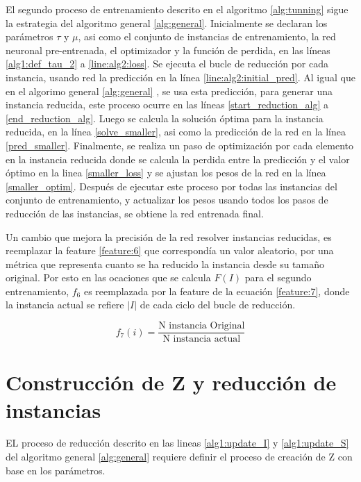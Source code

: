 \documentclass[spanish, a4paper, 12pt, openany,final]{book}
\begin{document}
El segundo proceso de entrenamiento descrito en el algoritmo \ref{alg:tunning} sigue la estrategia del algoritmo general \ref{alg:general}. Inicialmente se declaran los parámetros $\tau$ y $\mu$, asi como el conjunto de instancias de entrenamiento, la red neuronal pre-entrenada, el optimizador y la función de perdida, en las líneas \ref{alg1:def_tau_2} a \ref{line:alg2:loss}. Se ejecuta el bucle de reducción por cada instancia, usando red la predicción en la línea \ref{line:alg2:initial_pred}. Al igual que en el algorimo general \ref{alg:general} , se usa esta predicción, para generar una instancia reducida, este proceso ocurre en las líneas \ref{start_reduction_alg} a \ref{end_reduction_alg}. Luego se calcula la solución óptima para la instancia reducida, en la línea \ref{solve_smaller}, asi como la predicción de la red en la línea \ref{pred_smaller}. Finalmente, se realiza un paso de optimización por cada elemento en la instancia reducida donde se calcula la perdida entre la predicción y el valor óptimo en la linea \ref{smaller_loss} y se ajustan los pesos de la red en la línea \ref{smaller_optim}.
Después de ejecutar este proceso por todas las instancias del conjunto de entrenamiento, y actualizar los pesos usando todos los pasos de reducción de las instancias, se obtiene la red entrenada final.

Un cambio que mejora la precisión de la red resolver instancias reducidas, es reemplazar la feature \ref{feature:6} que correspondía un valor aleatorio, por una métrica que representa cuanto se ha reducido la instancia desde su tamaño original. Por esto en las ocaciones que se calcula $F(I)$ para el segundo entrenamiento, $f_6$ es reemplazada por la feature de la ecuación \ref{feature:7}, donde la instancia actual se refiere $|I|$ de cada ciclo del bucle de reducción.

\begin{equation}
	\label{feature:7}
	f_7(i) = \frac{\text{N instancia Original}}{\text{N instancia actual}}
\end{equation}




 \section{Construcción de Z y reducción de instancias}
 
 EL proceso de reducción descrito en las lineas \ref{alg1:update_I} y \ref{alg1:update_S} del algoritmo general \ref{alg:general} requiere definir el proceso de creación de Z con base en los parámetros.
 
\end{document}
